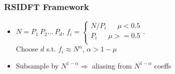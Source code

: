\documentclass[10pt,xcolor=table]{beamer}
\begin{document}
\begin{frame}\frametitle{RSIDFT Framework}
	\begin{itemize}
    \item $N = P_1 \ P_2 \ldots \ P_d$,  $f_i = \begin{cases}
    N/P_i  ~~~~~~~ \mu< 0.5\\
    P_i  ~~~~~~~  \mu >= 0.5  \\
    \end{cases} $.\\
    Choose $d$ s.t. $f_i \approx N^\alpha$, $\alpha > 1-\mu$
    \item Subsample by $N^{1-\alpha} \Rightarrow$ aliasing from $N^{1-\alpha}$ coeffs
    \end{itemize}
		\begin{figure}[t!]
			\begin{center}
				\resizebox{0.7\textwidth}{!}{}
			\end{center}	
			\label{fig:rsidft}
			\vspace{5 pt}
		\end{figure}
\end{frame}
\end{document}
